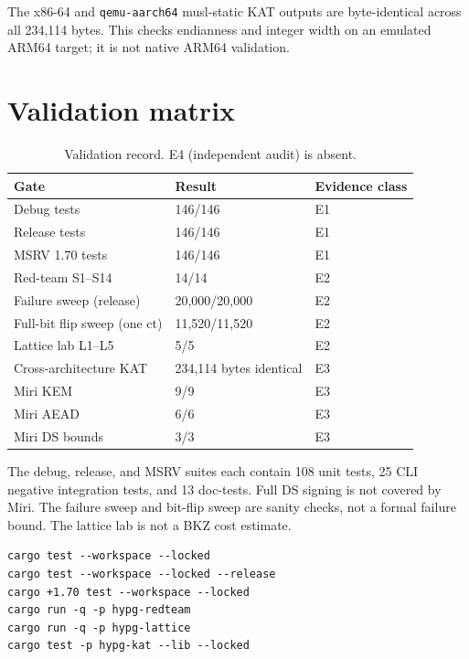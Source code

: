 \documentclass[11pt,a4paper]{article}
\theoremstyle{plain}
\theoremstyle{definition}
\theoremstyle{remark}
\begin{document}
The x86-64 and \texttt{qemu-aarch64} musl-static KAT outputs are
byte-identical across all 234,114 bytes.  This checks endianness and
integer width on an emulated ARM64 target; it is not native ARM64
validation.

\section{Validation matrix}
\label{sec:validation}

\begin{table}[t]
\centering
\small
\begin{tabular}{@{}lll@{}}
\toprule
Gate & Result & Evidence class \\
\midrule
Debug tests & 146/146 & E1 \\
Release tests & 146/146 & E1 \\
MSRV 1.70 tests & 146/146 & E1 \\
Red-team S1--S14 & 14/14 & E2 \\
Failure sweep (release) & 20,000/20,000 & E2 \\
Full-bit flip sweep (one ct) & 11,520/11,520 & E2 \\
Lattice lab L1--L5 & 5/5 & E2 \\
Cross-architecture KAT & 234,114 bytes identical & E3 \\
Miri KEM & 9/9 & E3 \\
Miri AEAD & 6/6 & E3 \\
Miri DS bounds & 3/3 & E3 \\
\bottomrule
\end{tabular}
\caption{Validation record.  E4 (independent audit) is absent.}
\label{tab:validation}
\end{table}

The debug, release, and MSRV suites each contain 108 unit tests, 25 CLI
negative integration tests, and 13 doc-tests.  Full DS signing is not
covered by Miri.  The failure sweep and bit-flip sweep are sanity
checks, not a formal failure bound.  The lattice lab is not a BKZ cost
estimate.

\begin{verbatim}
cargo test --workspace --locked
cargo test --workspace --locked --release
cargo +1.70 test --workspace --locked
cargo run -q -p hypg-redteam
cargo run -q -p hypg-lattice
cargo test -p hypg-kat --lib --locked
\end{verbatim}

\end{document}
